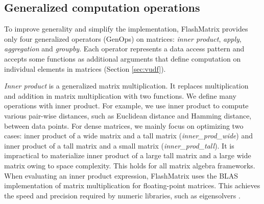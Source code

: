 


\subsection{Generalized computation operations} \label{sec:genop}
To improve generality and simplify the implementation, FlashMatrix provides
only four generalized operators (GenOps) on matrices: \textit{inner product},
\textit{apply}, \textit{aggregation} and \textit{groupby}. Each operator
represents a data access pattern and accepts some functions as additional
arguments that define computation
on individual elements in matrices (Section \ref{sec:vudf}).

\textit{Inner product} is a generalized matrix multiplication. It replaces
multiplication and addition in matrix multiplication with two functions.
We define many operations with inner product. For example, we use inner product
to compute various pair-wise distances, such as Euclidean distance and Hamming
distance, between data points. For dense matrices, we mainly focus on
optimizing two cases: inner product of a wide matrix and a tall matrix (\textit{inner\_prod\_wide}) and inner product of a tall matrix and a small
matrix (\textit{inner\_prod\_tall}). It is impractical to
materialize inner product of a large tall matrix and a large wide matrix owing
to space complexity. This holds for all matrix algebra frameworks.
When evaluating an inner product expression, FlashMatrix uses the BLAS 
implementation of matrix multiplication for floating-point matrices.
This achieves the speed and precision required by
numeric libraries, such as eigensolvers \cite{anasazi}.%


